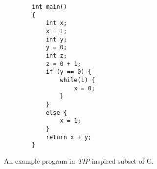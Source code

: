\begin{figure}[H]
    \centering
    \begin{verbatim}
        int main()
        {
            int x;
            x = 1;
            int y;
            y = 0;
            int z;
            z = 0 + 1;
            if (y == 0) {
                while(1) {
                    x = 0;
                }
            }
            else {
                x = 1;
            }
            return x + y;
        }
    \end{verbatim}
    \caption{An example program in \textit{TIP}-inspired subset of C.}
    \label{exampleprogram}
\end{figure}


